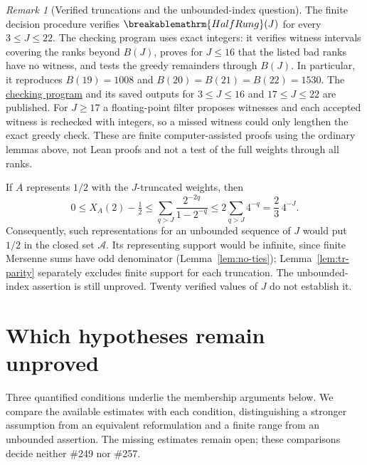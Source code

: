 \documentclass[11pt]{article}
\theoremstyle{plain}
\theoremstyle{definition}
\theoremstyle{remark}
\newtheorem{rem}[thm]{Remark}
\renewcommand{\mathrm}[1]{\ifmmode\breakablemathrm{#1}\else\textrm{#1}\fi}%
\begin{document}
\begin{rem}[Verified truncations and the unbounded-index question]
The finite decision procedure verifies $\mathrm{HalfRung}(J)$ for every
$3\le J\le22$.  The checking program uses exact integers: it verifies
witness intervals covering the ranks beyond $B(J)$, proves for $J\le16$
that the listed bad ranks have no witness, and tests the greedy remainders
through $B(J)$.  In particular, it reproduces $B(19)=1008$ and
$B(20)=B(21)=B(22)=1530$.
The
\href{https://github.com/wcook04/plectis-erdos/blob/f757115e03bebe5c04431a147da559015c680a37/research/experiments/erdos257/check_truncation_rung_ladder.py}{checking program}
and its saved outputs for
\href{https://github.com/wcook04/plectis-erdos/blob/f757115e03bebe5c04431a147da559015c680a37/research/experiments/erdos257/receipts/truncation-ladder-3-16.json}{$3\le J\le16$}
and
\href{https://github.com/wcook04/plectis-erdos/blob/f757115e03bebe5c04431a147da559015c680a37/research/experiments/erdos257/receipts/truncation-ladder-17-22.json}{$17\le J\le22$}
are published.  For $J\ge17$ a floating-point filter proposes witnesses
and each accepted witness is rechecked with integers, so a missed witness
could only lengthen the exact greedy check.  These are finite
computer-assisted proofs using the ordinary lemmas above, not Lean
proofs and not a test of the full weights through all ranks.

If $A$ represents $1/2$ with the $J$-truncated weights, then
\[
 0\le X_A(2)-\tfrac12
 \le\sum_{q>J}\frac{2^{-2q}}{1-2^{-q}}
 \le2\sum_{q>J}4^{-q}=\frac23\,4^{-J}.
\]
Consequently, such representations for an unbounded sequence of $J$
would put $1/2$ in the closed set $\mathcal A$.  Its representing support
would be infinite, since finite Mersenne sums have odd denominator
(Lemma~\ref{lem:no-ties}); Lemma~\ref{lem:tr-parity} separately excludes
finite support for each truncation.  The unbounded-index assertion is
still unproved.  Twenty verified values of $J$ do not establish it.
\end{rem}
\section{Which hypotheses remain unproved}
Three quantified conditions underlie the membership arguments below.
We compare the available estimates with each condition, distinguishing
a stronger assumption from an equivalent reformulation and a finite
range from an unbounded assertion. The missing estimates remain open;
these comparisons decide neither \#249 nor \#257.
\end{document}
